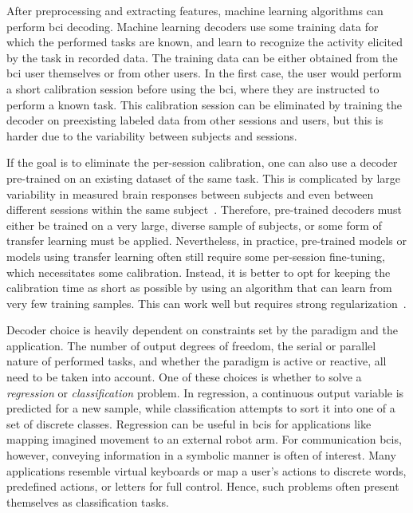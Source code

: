 After preprocessing and extracting features, machine learning algorithms can perform
\ac{bci} decoding.
Machine learning decoders use some training data for which the performed tasks are
known, and learn to recognize the activity elicited by the task in recorded data.
The training data can be either obtained from the \ac{bci} user themselves or from other
users.
In the first case, the user would perform a short calibration session before using the
\ac{bci}, where they are instructed to perform a known task.
This calibration session can be eliminated by training the decoder on preexisting
labeled data from other sessions and users, but this is harder due to the variability
between subjects and sessions.

If the goal is to eliminate the per-session calibration, one can also use a decoder
pre-trained on an existing dataset of the same task.
This is complicated by large variability in measured brain responses between subjects
and even between different sessions within the same subject~\cite{Guger2009,Saha2020}.
Therefore, pre-trained decoders must either be trained on a very large, diverse sample
of subjects, or some form of transfer learning must be applied.
Nevertheless, in practice, pre-trained models or models using transfer learning often
still require some per-session fine-tuning, which necessitates some calibration.
Instead, it is better to opt for keeping the calibration time as short as possible by
using an algorithm that can learn from very few training samples.
This can work well but requires strong regularization~\cite{VanDenKerchove2022}.

Decoder choice is heavily dependent on constraints set by the paradigm and the
application.
The number of output degrees of freedom, the serial or parallel nature of performed
tasks, and whether the paradigm is active or reactive, all need to be taken into
account.
One of these choices is whether to solve a \emph{regression} or \emph{classification}
problem.
In regression, a continuous output variable is predicted for a new sample, while
classification attempts to sort it into one of a set of discrete classes.
Regression can be useful in \acp{bci} for applications like mapping imagined movement to
an external robot arm.
For communication \acp{bci}, however, conveying information in a symbolic manner is
often of interest.
Many applications resemble virtual keyboards or map a user's actions to discrete words,
predefined actions, or letters for full control.
Hence, such problems often present themselves as classification tasks.

